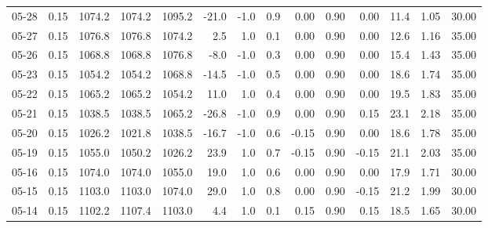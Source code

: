 \begin{threeparttable}
{\begin{tabular}{lrrrrrrrrrrrrr}
  05-28 &     0.15 & 1074.2 & 1074.2 & 1095.2 &      -21.0 &                     -1.0 &                 0.9 &       0.00 &      0.90 &           0.00 &             11.4 &            1.05 &                  30.00 \\
  05-27 &     0.15 & 1076.8 & 1076.8 & 1074.2 &        2.5 &                      1.0 &                 0.1 &       0.00 &      0.90 &           0.00 &             12.6 &            1.16 &                  35.00 \\
  05-26 &     0.15 & 1068.8 & 1068.8 & 1076.8 &       -8.0 &                     -1.0 &                 0.3 &       0.00 &      0.90 &           0.00 &             15.4 &            1.43 &                  35.00 \\
  05-23 &     0.15 & 1054.2 & 1054.2 & 1068.8 &      -14.5 &                     -1.0 &                 0.5 &       0.00 &      0.90 &           0.00 &             18.6 &            1.74 &                  35.00 \\
  05-22 &     0.15 & 1065.2 & 1065.2 & 1054.2 &       11.0 &                      1.0 &                 0.4 &       0.00 &      0.90 &           0.00 &             19.5 &            1.83 &                  35.00 \\
  05-21 &     0.15 & 1038.5 & 1038.5 & 1065.2 &      -26.8 &                     -1.0 &                 0.9 &       0.00 &      0.90 &           0.15 &             23.1 &            2.18 &                  35.00 \\
  05-20 &     0.15 & 1026.2 & 1021.8 & 1038.5 &      -16.7 &                     -1.0 &                 0.6 &      -0.15 &      0.90 &           0.00 &             18.6 &            1.78 &                  35.00 \\
  05-19 &     0.15 & 1055.0 & 1050.2 & 1026.2 &       23.9 &                      1.0 &                 0.7 &      -0.15 &      0.90 &          -0.15 &             21.1 &            2.03 &                  35.00 \\
  05-16 &     0.15 & 1074.0 & 1074.0 & 1055.0 &       19.0 &                      1.0 &                 0.6 &       0.00 &      0.90 &           0.00 &             17.9 &            1.71 &                  30.00 \\
  05-15 &     0.15 & 1103.0 & 1103.0 & 1074.0 &       29.0 &                      1.0 &                 0.8 &       0.00 &      0.90 &          -0.15 &             21.2 &            1.99 &                  30.00 \\
  05-14 &     0.15 & 1102.2 & 1107.4 & 1103.0 &        4.4 &                      1.0 &                 0.1 &       0.15 &      0.90 &           0.15 &             18.5 &            1.65 &                  30.00 \\

\end{tabular}}
\end{threeparttable}
